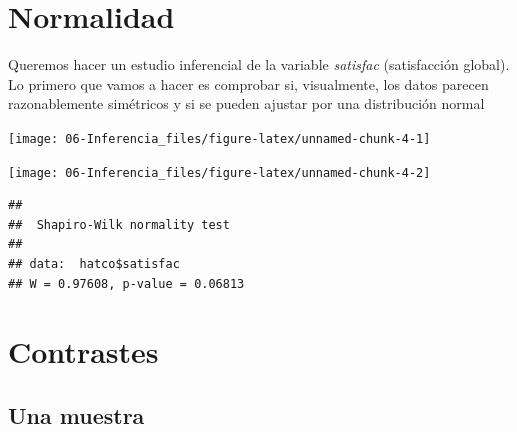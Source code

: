 \documentclass[
]{book}
\newenvironment{Shaded}{\begin{snugshade}}{\end{snugshade}}
\newcommand{\FunctionTok}[1]{\textcolor[rgb]{0.00,0.00,0.00}{#1}}
\newcommand{\NormalTok}[1]{#1}
\newcommand{\SpecialCharTok}[1]{\textcolor[rgb]{0.00,0.00,0.00}{#1}}
\theoremstyle{break}
\theoremstyle{nonumberplain}
\begin{document}
\hypertarget{normalidad}{%
\section{Normalidad}\label{normalidad}}

Queremos hacer un estudio inferencial de la variable \emph{satisfac} (satisfacción global). Lo primero
que vamos a hacer es comprobar si, visualmente, los datos parecen razonablemente
simétricos y si se pueden ajustar por una distribución normal

\begin{Shaded}
\end{Shaded}

\begin{center}\texttt{[image: 06-Inferencia\_files/figure-latex/unnamed-chunk-4-1]} \end{center}

\begin{Shaded}
\end{Shaded}

\begin{center}\texttt{[image: 06-Inferencia\_files/figure-latex/unnamed-chunk-4-2]} \end{center}

\begin{Shaded}
\end{Shaded}

\begin{verbatim}
## 
##  Shapiro-Wilk normality test
## 
## data:  hatco$satisfac
## W = 0.97608, p-value = 0.06813
\end{verbatim}

\hypertarget{contrastes}{%
\section{Contrastes}\label{contrastes}}

\hypertarget{una-muestra}{%
\subsection{Una muestra}\label{una-muestra}}
\end{document}
